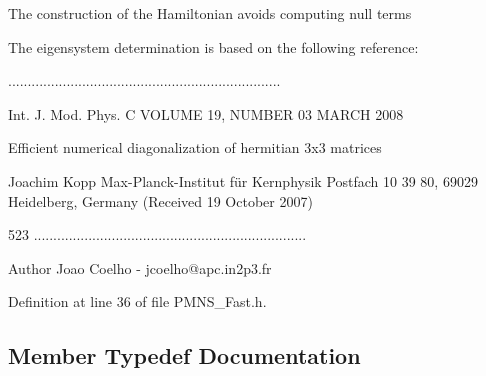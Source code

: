 \begin{DoxyItemize}
\item The construction of the Hamiltonian avoids computing null terms~\newline

\item The eigensystem determination is based on the following reference\+:~\newline
 
\begin{DoxyPre}
......................................................................\end{DoxyPre}

\end{DoxyItemize}


\begin{DoxyPre} Int. J. Mod. Phys. C       VOLUME 19, NUMBER 03            MARCH 2008\end{DoxyPre}



\begin{DoxyPre}     Efficient numerical diagonalization of hermitian 3x3 matrices\end{DoxyPre}



\begin{DoxyPre}                            Joachim Kopp
                  Max-Planck-Institut für Kernphysik 
             Postfach 10 39 80, 69029 Heidelberg, Germany
                    (Received 19 October 2007)\end{DoxyPre}



\begin{DoxyPre}                                523
......................................................................
 \end{DoxyPre}


\begin{DoxyAuthor}{Author}
Joao Coelho -\/ jcoelho@apc.\+in2p3.\+fr 
\end{DoxyAuthor}


Definition at line 36 of file P\+M\+N\+S\+\_\+\+Fast.\+h.



\subsection{Member Typedef Documentation}
